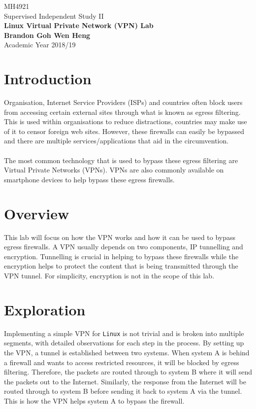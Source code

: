 \documentclass[a4paper,12pt]{article}
\begin{document}
	\begin{titlepage}
		\begin{center}
			\vspace*{9em}
			\Huge 
			MH4921\\ Supervised Independent Study II\\
			\vspace*{4em}
			\LARGE
			\textbf{Linux Virtual Private Network (VPN) Lab}\\		
			\vspace{4em}
			\textbf{Brandon Goh Wen Heng}\\
			\vspace*{4em}
			Academic Year 2018/19
			\vfill
		\end{center}
	\end{titlepage}
	
	\tableofcontents
	\newpage
	\section{Introduction}
	Organisation, Internet Service Providers (ISPs) and countries often block users from accessing certain external sites through what is known as egress filtering. This is used within organisations to reduce distractions, countries may make use of it to censor foreign web sites. However, these firewalls can easily be bypassed and there are multiple services/applications that aid in the circumvention.\\\\The most common technology that is used to bypass these egress filtering are Virtual Private Networks (VPNs). VPNs are also commonly available on smartphone devices to help bypass these egress firewalls.
	\section{Overview}
	This lab will focus on how the VPN works and how it can be used to bypass egress firewalls. A VPN usually depends on two components, IP tunnelling and encryption. Tunnelling is crucial in helping to bypass these firewalls while the encryption helps to protect the content that is being transmitted through the VPN tunnel. For simplicity, encryption is not in the scope of this lab.
	\section{Exploration}
	Implementing a simple VPN for \texttt{Linux} is not trivial and is broken into multiple segments, with detailed observations for each step in the process. By setting up the VPN, a tunnel is established between two systems. When system A is behind a firewall and wants to access restricted resources, it will be blocked by egress filtering. Therefore, the packets are routed through to system B where it will send the packets out to the Internet. Similarly, the response from the Internet will be routed through to system B before sending it back to system A via the tunnel. This is how the VPN helps system A to bypass the firewall.
\end{document}
